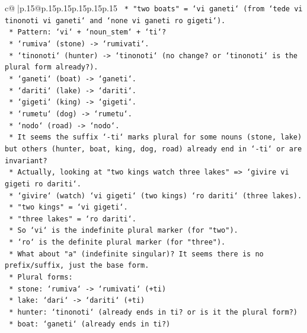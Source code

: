 \documentclass{article}
\begin{document}
{\begin{supertabular}{c@{$\;$}|p{.15\linewidth}@{}p{.15\linewidth}p{.15\linewidth}p{.15\linewidth}p{.15\linewidth}p{.15\linewidth}}
{{{\texttt{            *   "two boats" = `vi ganeti` (from `tede vi tinonoti vi ganeti` and `none vi ganeti ro gigeti`).} \\
\texttt{            *   Pattern: `vi` + `noun\_stem` + `ti`?} \\
\texttt{            *   `rumiva` (stone) {-}> `rumivati`.} \\
\texttt{            *   `tinonoti` (hunter) {-}> `tinonoti` (no change? or `tinonoti` is the plural form already?).} \\
\texttt{            *   `ganeti` (boat) {-}> `ganeti`.} \\
\texttt{            *   `dariti` (lake) {-}> `dariti`.} \\
\texttt{            *   `gigeti` (king) {-}> `gigeti`.} \\
\texttt{            *   `rumetu` (dog) {-}> `rumetu`.} \\
\texttt{            *   `nodo` (road) {-}> `nodo`.} \\
\texttt{            *   It seems the suffix `{-}ti` marks plural for some nouns (stone, lake) but others (hunter, boat, king, dog, road) already end in `{-}ti` or are invariant?} \\
\texttt{            *   Actually, looking at "two kings watch three lakes" => `givire vi gigeti ro dariti`.} \\
\texttt{                *   `givire` (watch) `vi gigeti` (two kings) `ro dariti` (three lakes).} \\
\texttt{                *   "two kings" = `vi gigeti`.} \\
\texttt{                *   "three lakes" = `ro dariti`.} \\
\texttt{            *   So `vi` is the indefinite plural marker (for "two").} \\
\texttt{            *   `ro` is the definite plural marker (for "three").} \\
\texttt{            *   What about "a" (indefinite singular)? It seems there is no prefix/suffix, just the base form.} \\
\texttt{            *   Plural forms:} \\
\texttt{                *   stone: `rumiva` {-}> `rumivati` (+ti)} \\
\texttt{                *   lake: `dari` {-}> `dariti` (+ti)} \\
\texttt{                *   hunter: `tinonoti` (already ends in ti? or is it the plural form?)} \\
\texttt{                *   boat: `ganeti` (already ends in ti?)} \\
}}}
\end{supertabular}}
\end{document}
